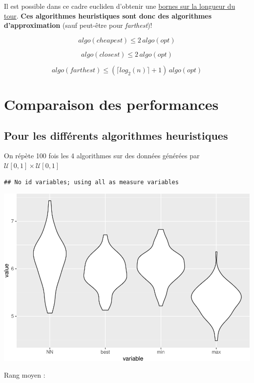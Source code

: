 \documentclass[
]{article}
\begin{document}
Il est possible dans ce cadre eucliden d'obtenir une
\href{http://www.cs.albany.edu/~res/tsp_sicomp_1977.pdf}{bornes sur la
longueur du tour}. \textbf{Ces algorithmes heuristiques sont donc des
algorithmes d'approximation} (sauf peut-être pour \emph{farthest})!

\[algo(cheapest) \le 2 \,algo(opt)\]

\[algo(closest) \le 2 \,algo(opt)\]

\[algo(farthest) \le (\lceil log_2(n) \rceil + 1) \,algo(opt)\]

\hypertarget{comparaison-des-performances}{%
\section{Comparaison des
performances}\label{comparaison-des-performances}}

\hypertarget{pour-les-diffuxe9rents-algorithmes-heuristiques}{%
\subsection{Pour les différents algorithmes
heuristiques}\label{pour-les-diffuxe9rents-algorithmes-heuristiques}}

On répète 100 fois les 4 algorithmes sur des données générées par
\(\mathcal{U}[0,1] \times \mathcal{U}[0,1]\)

\begin{verbatim}
## No id variables; using all as measure variables
\end{verbatim}

\includegraphics{rapport_TSP_files/figure-latex/plot res violon-1.pdf}

Rang moyen :
\end{document}
